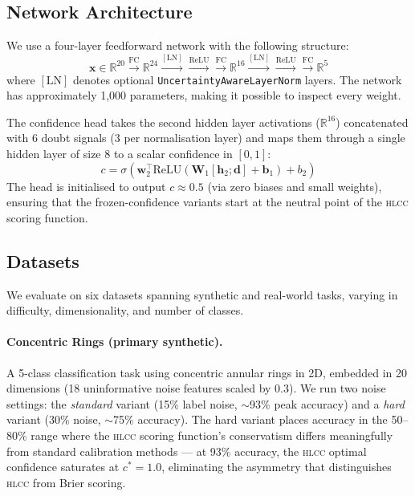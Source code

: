 \documentclass[11pt,a4paper]{article}
\newcommand{\hlcc}{\textsc{hlcc}}
\newcommand{\R}{\mathbb{R}}
\newcommand{\cstar}{c^{*}}
\begin{document}
\subsection{Network Architecture}

We use a four-layer feedforward network with the following structure:
\begin{equation}
  \mathbf{x} \in \R^{20} \xrightarrow{\text{FC}} \R^{24}
  \xrightarrow{[\text{LN}]} \xrightarrow{\text{ReLU}}
  \xrightarrow{\text{FC}} \R^{16}
  \xrightarrow{[\text{LN}]} \xrightarrow{\text{ReLU}}
  \xrightarrow{\text{FC}} \R^{5}
  \label{eq:arch}
\end{equation}
where $[\text{LN}]$ denotes optional \texttt{UncertaintyAwareLayerNorm}
layers.  The network has approximately 1,000 parameters, making it
possible to inspect every weight.

The confidence head takes the second hidden layer activations
($\R^{16}$) concatenated with 6 doubt signals (3 per normalisation
layer) and maps them through a single hidden layer of size 8 to a
scalar confidence in $[0, 1]$:
\begin{equation}
  c = \sigma\!\left(\mathbf{w}_2^{\top} \text{ReLU}(\mathbf{W}_1 [\mathbf{h}_2; \mathbf{d}] + \mathbf{b}_1) + b_2\right)
  \label{eq:head}
\end{equation}
The head is initialised to output $c \approx 0.5$ (via zero biases and
small weights), ensuring that the frozen-confidence variants start at
the neutral point of the \hlcc{} scoring function.

\subsection{Datasets}
\label{sec:datasets}

We evaluate on six datasets spanning synthetic and real-world tasks,
varying in difficulty, dimensionality, and number of classes.

\paragraph{Concentric Rings (primary synthetic).}
A 5-class classification task using concentric annular rings in 2D,
embedded in 20 dimensions (18 uninformative noise features scaled by
0.3).  We run two noise settings: the \emph{standard} variant (15\%
label noise, $\sim$93\% peak accuracy) and a \emph{hard} variant
(30\% noise, $\sim$75\% accuracy).  The hard variant places accuracy
in the 50--80\% range where the \hlcc{} scoring function's
conservatism differs meaningfully from standard calibration methods
--- at 93\% accuracy, the \hlcc{} optimal confidence saturates at
$\cstar = 1.0$, eliminating the asymmetry that distinguishes \hlcc{}
from Brier scoring.
\end{document}
